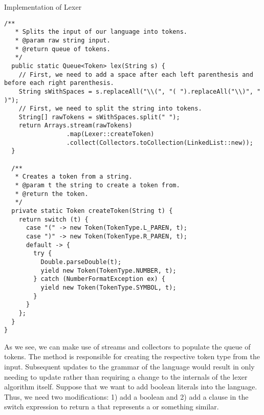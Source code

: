 \begin{verbnobox}[\footnotesize]
\begin{verbnobox}[\footnotesize]
\begin{verbnobox}[\footnotesize]
\begin{verbnobox}[\footnotesize]
\begin{cl}{Implementation of Lexer}
\begin{lstlisting}[language=MyJava]
  /**
   * Splits the input of our language into tokens.
   * @param raw string input.
   * @return queue of tokens.
   */
  public static Queue<Token> lex(String s) {
    // First, we need to add a space after each left parenthesis and before each right parenthesis.
    String sWithSpaces = s.replaceAll("\\(", "( ").replaceAll("\\)", " )");
    // First, we need to split the string into tokens.
    String[] rawTokens = sWithSpaces.split(" ");
    return Arrays.stream(rawTokens)
                 .map(Lexer::createToken)
                 .collect(Collectors.toCollection(LinkedList::new));
  }

  /**
   * Creates a token from a string.
   * @param t the string to create a token from.
   * @return the token.
   */
  private static Token createToken(String t) {
    return switch (t) {
      case "(" -> new Token(TokenType.L_PAREN, t);
      case ")" -> new Token(TokenType.R_PAREN, t);
      default -> {
        try {
          Double.parseDouble(t);
          yield new Token(TokenType.NUMBER, t);
        } catch (NumberFormatException ex) {
          yield new Token(TokenType.SYMBOL, t);
        }
      }
    };
  }
}
\end{lstlisting}
\end{cl}

As we see, we can make use of streams and collectors to populate the queue of tokens. The  method is responsible for creating the respective token type from the input. Subsequent updates to the grammar of the language would result in only needing to update  rather than requiring a change to the internals of the lexer algorithm itself. Suppose that we want to add boolean literals into the language. Thus, we need two modifications: 1) add a boolean  and 2) add a clause in the switch expression to return a  that represents a  or something similar.



\end{verbnobox}
\end{verbnobox}
\end{verbnobox}
\end{verbnobox}
